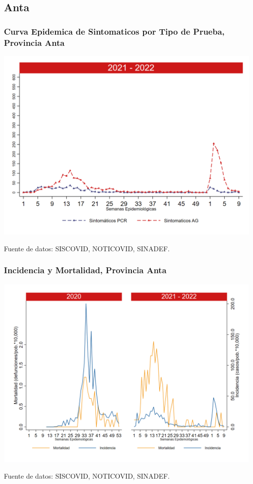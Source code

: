 \documentclass[xcolor=table]{beamer}
\begin{document}
\subsection{Anta}
\begin{frame}[label=Anta]
	\frametitle{Curva Epidemica de Sintomaticos por Tipo de Prueba, Provincia Anta}
	\vspace{-.5cm}
	\begin{center}
		\includegraphics[width=0.8\linewidth, trim={0cm .5cm 0cm 0.2cm},clip]{../figuras/sinto_prueba20_21_2.png}
	\end{center}
	{\tiny Fuente de datos: SISCOVID, NOTICOVID, SINADEF.}
	\hyperlink{TipoPrueba}{}
\end{frame}

\begin{frame}[label=Anta]
	\frametitle{Incidencia y Mortalidad, Provincia Anta}
	\vspace{-.5cm}
	\begin{center}
		\includegraphics[width=0.8\linewidth, trim={0cm .5cm 0cm 0.2cm},clip]{../figuras/incidencia_mortalidad_20_21_2.png}
	\end{center}
	{\tiny Fuente de datos: SISCOVID, NOTICOVID, SINADEF.}
\end{frame}
\end{document}
